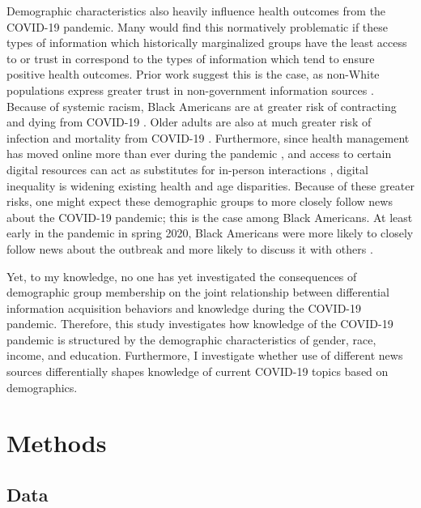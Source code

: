 \documentclass[11pt]{article}
\begin{document}
Demographic characteristics also heavily influence health outcomes from the COVID-19 pandemic. Many would find this normatively problematic if these types of information which historically marginalized groups have the least access to or trust in correspond to the types of information which tend to ensure positive health outcomes. Prior work suggest this is the case, as non-White populations express greater trust in non-government information sources \citep{Fridman2020}.
Because of systemic racism, Black Americans are at greater risk of contracting and dying from COVID-19 \citep{Adegunsoye2020,Kim2020,Millett2020,PriceHaywood2020}.
Older adults are also at much greater risk of infection and mortality from COVID-19 \citep{Ho2020,LeCouteur2020}.
Furthermore, since health management has moved online more than ever during the pandemic \citep{Khilnani2020}, and access to certain digital resources can act as substitutes for in-person interactions \citep{Robinson2020b}, digital inequality is widening existing health and age disparities.
Because of these greater risks, one might expect these demographic groups to more closely follow news about the COVID-19 pandemic; this is the case among Black Americans. 
At least early in the pandemic in spring 2020, Black Americans were more likely to closely follow news about the outbreak and more likely to discuss it with others \citep{Mitchell2020b}. 

Yet, to my knowledge, no one has yet investigated the consequences of demographic group membership on the joint relationship between differential information acquisition behaviors and knowledge during the COVID-19 pandemic. Therefore, this study investigates how knowledge of the COVID-19 pandemic is structured by the demographic characteristics of gender, race, income, and education. Furthermore, I investigate whether use of different news sources differentially shapes knowledge of current COVID-19 topics based on demographics.


\section{Methods}\label{sec:methods}

\subsection{Data}\label{sec:data}
\end{document}
